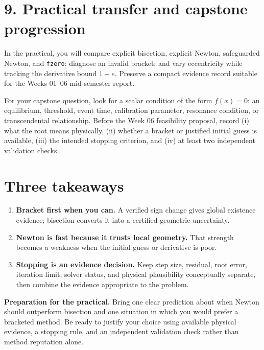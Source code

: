 \documentclass[11pt,a4paper]{article}
\begin{document}
\section*{9. Practical transfer and capstone progression}
In the practical, you will compare explicit bisection, explicit Newton, safeguarded Newton, and \texttt{fzero}; diagnose an invalid bracket; and vary eccentricity while tracking the derivative bound $1-e$. Preserve a compact evidence record suitable for the Weeks 01--06 mid-semester report.

For your capstone question, look for a scalar condition of the form $f(x)=0$: an equilibrium, threshold, event time, calibration parameter, resonance condition, or transcendental relationship. Before the Week 06 feasibility proposal, record (i) what the root means physically, (ii) whether a bracket or justified initial guess is available, (iii) the intended stopping criterion, and (iv) at least two independent validation checks.

\section*{Three takeaways}
\begin{keybox}
\begin{enumerate}[nosep,leftmargin=5mm]
  \item \textbf{Bracket first when you can.} A verified sign change gives global existence evidence; bisection converts it into a certified geometric uncertainty.
  \item \textbf{Newton is fast because it trusts local geometry.} That strength becomes a weakness when the initial guess or derivative is poor.
  \item \textbf{Stopping is an evidence decision.} Keep step size, residual, root error, iteration limit, solver status, and physical plausibility conceptually separate, then combine the evidence appropriate to the problem.
\end{enumerate}
\end{keybox}

\begin{keybox}
\textbf{Preparation for the practical.} Bring one clear prediction about when Newton should outperform bisection and one situation in which you would prefer a bracketed method. Be ready to justify your choice using available physical evidence, a stopping rule, and an independent validation check rather than method reputation alone.
\end{keybox}
\end{document}
